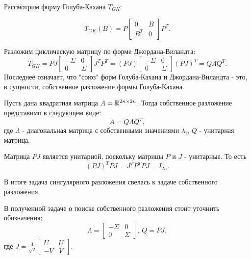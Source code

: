 Рассмотрим  форму Голуба-Кахана \(T_{GK}\):

\begin{equation}
T_{GK} (B) = P \begin{bmatrix} 0 & B \\ B^T & 0 \end{bmatrix} P^T .
\end{equation}

Разложим циклическую матрицу по форме Джордана-Виландта:
\begin{equation}
T_{GK} = P J\begin{bmatrix} -\Sigma & 0 \\ 0 & \Sigma \end{bmatrix}J^T P^T = (PJ) \begin{bmatrix} -\Sigma & 0 \\ 0 & \Sigma \end{bmatrix} (PJ)^T=Q\Lambda Q^T.
\end{equation}
Последнее означает, что "союз" форм Голуба-Кахана и Джордана-Виландта - это, в сущности, собственное разложение формы Голуба-Кахана.

\begin{note}
    Пусть дана квадратная матрица \(A=\mathbb{R}^{2n \times 2n}\). 
    Тогда собственное разложение представимо в следующем виде:
    \[
     A=Q\Lambda Q^T,
    \]
    где \(\Lambda\) - диагональная матрица с собственными значениями \(\lambda_i\), \(Q\) - унитарная матрица. 
\end{note}

\begin{note}
    Матрица \(PJ\) является унитарной, поскольку матрицы \(P\) и \(J\) - унитарные. То есть 
    \[(PJ)^TPJ=J^TP^TPJ=I_{2n}.\]
\end{note}

В итоге задача сингулярного разложения свелась к задаче собственного разложения. 

\begin{note}
    В полученной задаче о поиске собственного разложения стоит уточнить обозначения:
    \[
    \Lambda = \begin{bmatrix} -\Sigma & 0 \\ 0 & \Sigma \end{bmatrix}, \ Q= PJ,
    \]
    где \(J= \frac{1}{\sqrt{2}}\begin{bmatrix}
    U & U \\
    -V & V
\end{bmatrix}\).
\end{note}

